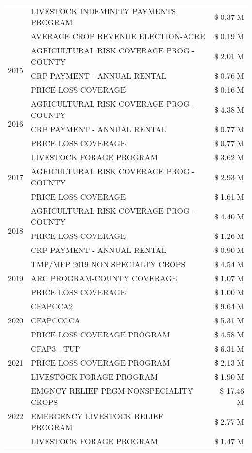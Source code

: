 \begin{tabular}{llr}
 & LIVESTOCK INDEMINITY PAYMENTS PROGRAM & \$ 0.37 M \\
 & AVERAGE CROP REVENUE ELECTION-ACRE & \$ 0.19 M \\
\cline{1-3}
\multirow[t]{3}{*}{2015} & AGRICULTURAL RISK COVERAGE PROG - COUNTY & \$ 2.01 M \\
 & CRP PAYMENT - ANNUAL RENTAL & \$ 0.76 M \\
 & PRICE LOSS COVERAGE & \$ 0.16 M \\
\cline{1-3}
\multirow[t]{3}{*}{2016} & AGRICULTURAL RISK COVERAGE PROG - COUNTY & \$ 4.38 M \\
 & CRP PAYMENT - ANNUAL RENTAL & \$ 0.77 M \\
 & PRICE LOSS COVERAGE & \$ 0.77 M \\
\cline{1-3}
\multirow[t]{3}{*}{2017} & LIVESTOCK FORAGE PROGRAM & \$ 3.62 M \\
 & AGRICULTURAL RISK COVERAGE PROG - COUNTY & \$ 2.93 M \\
 & PRICE LOSS COVERAGE & \$ 1.61 M \\
\cline{1-3}
\multirow[t]{3}{*}{2018} & AGRICULTURAL RISK COVERAGE PROG - COUNTY & \$ 4.40 M \\
 & PRICE LOSS COVERAGE & \$ 1.26 M \\
 & CRP PAYMENT - ANNUAL RENTAL & \$ 0.90 M \\
\cline{1-3}
\multirow[t]{3}{*}{2019} & TMP/MFP 2019 NON SPECIALTY CROPS & \$ 4.54 M \\
 & ARC PROGRAM-COUNTY COVERAGE & \$ 1.07 M \\
 & PRICE LOSS COVERAGE & \$ 1.00 M \\
\cline{1-3}
\multirow[t]{3}{*}{2020} & CFAPCCA2 & \$ 9.64 M \\
 & CFAPCCCCA & \$ 5.31 M \\
 & PRICE LOSS COVERAGE PROGRAM & \$ 4.58 M \\
\cline{1-3}
\multirow[t]{3}{*}{2021} & CFAP3 - TUP & \$ 6.31 M \\
 & PRICE LOSS COVERAGE PROGRAM & \$ 2.13 M \\
 & LIVESTOCK FORAGE PROGRAM & \$ 1.90 M \\
\cline{1-3}
\multirow[t]{3}{*}{2022} & EMGNCY RELIEF PRGM-NONSPECIALITY CROPS & \$ 17.46 M \\
 & EMERGENCY LIVESTOCK RELIEF PROGRAM & \$ 2.77 M \\
 & LIVESTOCK FORAGE PROGRAM & \$ 1.47 M \\
\cline{1-3}
\bottomrule
\end{tabular}
